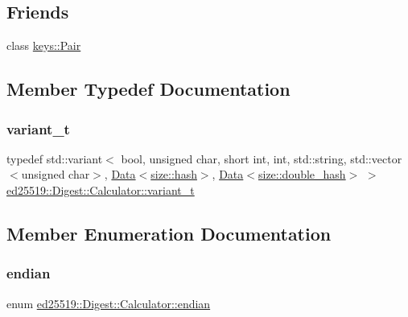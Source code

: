 \subsection*{Friends}
\begin{DoxyCompactItemize}
\item 
class \mbox{\hyperlink{structed25519_1_1_digest_1_1_calculator_ad89670fe663c8c8526b69b1bc6a87c19}{keys\+::\+Pair}}
\end{DoxyCompactItemize}


\subsection{Member Typedef Documentation}
\mbox{\label{structed25519_1_1_digest_1_1_calculator_a477919cc24c842e3cfe76f515ca5c946}} 
\subsubsection{\texorpdfstring{variant\+\_\+t}{variant\_t}}
{\footnotesize\ttfamily typedef std\+::variant$<$ bool, unsigned char, short int, int, std\+::string, std\+::vector$<$unsigned char$>$, \mbox{\hyperlink{classed25519_1_1_data}{Data}}$<$\mbox{\hyperlink{namespaceed25519_1_1size_a0c20525cc9711076ec093177a8e36c25}{size\+::hash}}$>$, \mbox{\hyperlink{classed25519_1_1_data}{Data}}$<$\mbox{\hyperlink{namespaceed25519_1_1size_ac853f864bb12792f88647a998c3c030f}{size\+::double\+\_\+hash}}$>$ $>$ \mbox{\hyperlink{structed25519_1_1_digest_1_1_calculator_a477919cc24c842e3cfe76f515ca5c946}{ed25519\+::\+Digest\+::\+Calculator\+::variant\+\_\+t}}}



\subsection{Member Enumeration Documentation}
\mbox{\label{structed25519_1_1_digest_1_1_calculator_a9bbea874787f93cdf4841b30c1c0d9a3}} 
\subsubsection{\texorpdfstring{endian}{endian}}
{\footnotesize\ttfamily enum \mbox{\hyperlink{structed25519_1_1_digest_1_1_calculator_a9bbea874787f93cdf4841b30c1c0d9a3}{ed25519\+::\+Digest\+::\+Calculator\+::endian}}}


